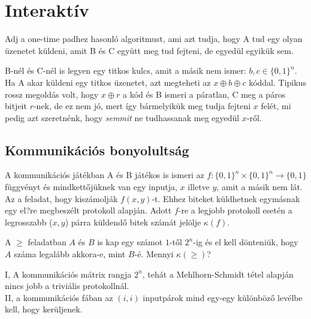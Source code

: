 \chapter{Interakt\'iv}

\begin{Exercise}[counter={sorszam}, difficulty=0]
	Adj a one-time padhez hasonl\'o algoritmust, ami azt tudja, hogy A tud egy olyan \"uzenetet k\"uldeni, amit B \'es C egy\"utt meg tud fejteni, de egyed\"ul egyik\"uk sem.
\end{Exercise}
\begin{Answer}
	B-n\'el \'es C-n\'el is legyen egy titkos kulcs, amit a m\'asik nem ismer: $b,c\in\{0,1\}^n$. Ha A akar k\"uldeni egy titkos \"uzenetet, azt megteheti az $x\oplus b\oplus c$ k\'oddal. Tipikus rossz megold\'as volt, hogy $x\oplus r$ a k\'od \'es B ismeri a p\'aratlan, C meg a p\'aros bitjeit $r$-nek, de ez nem j\'o, mert \'igy b\'armelyik\"uk meg tudja fejteni $x$ fel\'et, mi pedig azt szeretn\'enk, hogy \emph{semmit} ne tudhassanak meg egyed\"ul $x$-r\H ol.
\end{Answer}

\section{Kommunik\'aci\'os bonyolults\'ag}

 A kommunik\'aci\'os j\'at\'ekban A \'es B játékos is ismeri az $f:\{0,1\}^n\times \{0,1\}^n\rightarrow \{0,1\}$ függvényt \'es mindkett\H oj\"uknek van egy inputja, $x$ illetve $y$, amit a másik nem lát. Az a feladat, hogy kisz\'amolj\'ak $f(x,y)$-t. Ehhez biteket küldhetnek egymásnak egy el?re megbeszélt protokoll alapján. Adott $f$-re a legjobb protokoll esetén a legrosszabb ($x,y$) párra k\"uldend\H o bitek sz\'am\'at jel\"olje $\kappa(f)$.

\begin{Exercise}[counter={sorszam}, difficulty=0]
	A $\ge$ feladatban $A$ \'es $B$ is kap egy sz\'amot $1$-t\H ol $2^n$-ig \'es el kell d\"onteni\"uk, hogy $A$ sz\'ama legal\'abb akkora-e, mint $B$-\'e. Mennyi $\kappa(\ge)$?
\end{Exercise}
\begin{Answer}
	I, A kommunik\'aci\'os m\'atrix rangja $2^n$, teh\'at a Mehlhorn-Schmidt t\'etel alapj\'an nincs jobb a trivi\'alis protokolln\'al.\\
	II, a kommunik\'aci\'os f\'aban az $(i,i)$ inputp\'arok mind egy-egy k\"ul\"onb\"oz\H o lev\'elbe kell, hogy ker\"uljenek.
\end{Answer}


